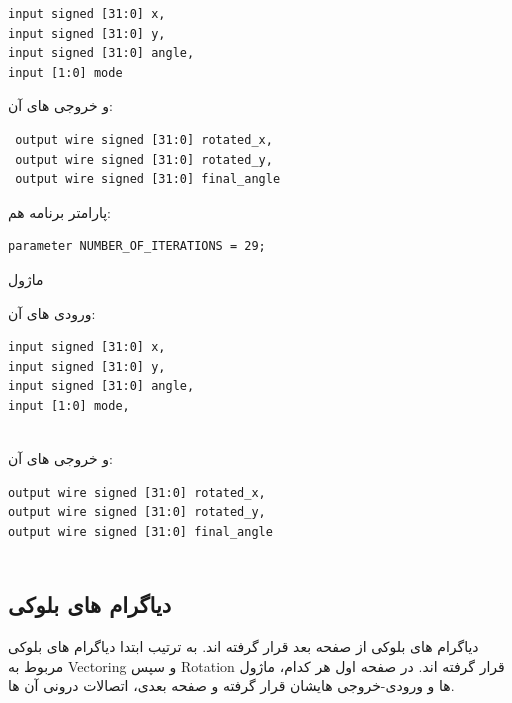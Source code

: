 \documentclass[12pt,titlepage,a4page , tikz , multi,table , svgnames,xcdraw]{article}
\begin{document}
\begin{latin}
\begin{verbatim}
input signed [31:0] x,
input signed [31:0] y,
input signed [31:0] angle,
input [1:0] mode
\end{verbatim}
\end{latin}

و خروجی های آن:

\begin{latin}
\begin{verbatim}
 output wire signed [31:0] rotated_x,
 output wire signed [31:0] rotated_y,
 output wire signed [31:0] final_angle
\end{verbatim}
\end{latin}


پارامتر برنامه هم:

\begin{latin}
\begin{verbatim}
parameter NUMBER_OF_ITERATIONS = 29;
\end{verbatim}
\end{latin}


\hrulefill

ماژول 

ورودی های آن:

\begin{latin}

\begin{verbatim}
input signed [31:0] x,
input signed [31:0] y,
input signed [31:0] angle,
input [1:0] mode,
   
\end{verbatim}

\end{latin}


و خروجی های آن:


\begin{latin}

\begin{verbatim}
output wire signed [31:0] rotated_x,
output wire signed [31:0] rotated_y,
output wire signed [31:0] final_angle
   
\end{verbatim}
\end{latin}

\newpage

\subsection{دیاگرام های بلوکی}


دیاگرام های بلوکی از صفحه بعد قرار گرفته اند. به ترتیب ابتدا دیاگرام های بلوکی مربوط به Vectoring و سپس Rotation قرار گرفته اند. در صفحه اول هر کدام، ماژول ها و ورودی-خروجی هایشان قرار گرفته و صفحه بعدی، اتصالات درونی آن ها.
\end{document}

